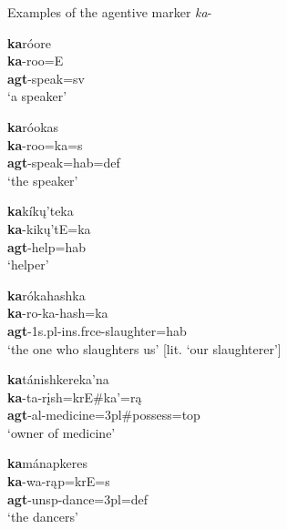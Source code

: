 \begin{exe}

\item\label{AgentKA} Examples of the agentive marker \textit{ka}-

    \begin{xlist}
    
    \item\label{AgentKA1} \glll \textbf{ka}róore\\
    \textbf{ka}-roo=E\\
    \textbf{agt}-\textnormal{speak}=sv\\
    \glt `a speaker' \citep[15]{kennard1936}
    
    \item\label{AgentKA2} \glll \textbf{ka}róokas\\
    \textbf{ka}-roo=ka=s\\
    \textbf{agt}-\textnormal{speak}=hab=def\\
    \glt `the speaker' \citep[15]{kennard1936}   
    
    \item\label{AgentKA3} \glll \textbf{ka}kíkų'teka\\
    \textbf{ka}-kikų'tE=ka\\
    \textbf{agt}-\textnormal{help}=hab\\
    \glt `helper' \citep[123]{hollow1973a}
    
	\item\label{AgentKA4} \glll \textbf{ka}{ró}kahashka\\
	\textbf{ka}-{ro}-ka-hash=ka\\
	\textbf{agt}-{1s.pl}-ins.frce-\textnormal{slaughter}=hab\\
	\glt `the one who slaughters us' [lit. `our slaughterer']\citep[146]{hollow1973a}
	
	\item\label{AgentKA5} \glll \textbf{ka}tánishkereka'na\\
	\textbf{ka}-ta-rįsh=krE\#ka'=rą\\
	\textbf{agt}-al-\textnormal{medicine}=3pl\#\textnormal{possess}=top\\
	\glt `owner of medicine' \citep[15]{kennard1936}
	
	\item\label{AgentKA6} \glll \textbf{ka}mánapkeres\\
	\textbf{ka}-wa-rąp=krE=s\\
	\textbf{agt}-unsp-\textnormal{dance}=3pl=def\\
	\glt `the dancers' \citep[15]{kennard1936}
	

\end{xlist}
\end{exe}
